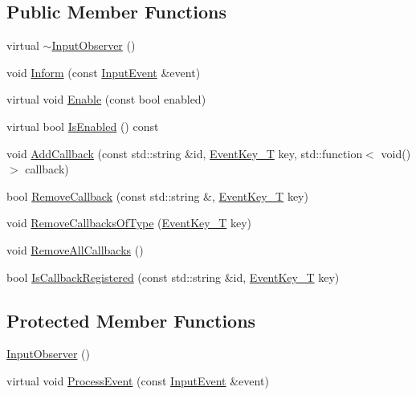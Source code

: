 \subsection*{Public Member Functions}
\begin{DoxyCompactItemize}
\item 
virtual \mbox{\hyperlink{classec_1_1_input_observer_ad6e40c0099cf4fe7aa9a54ef30e12046}{$\sim$\+Input\+Observer}} ()
\item 
void \mbox{\hyperlink{classec_1_1_input_observer_a9d12b9998638708cae180340de2c8550}{Inform}} (const \mbox{\hyperlink{structec_1_1_input_event}{Input\+Event}} \&event)
\item 
virtual void \mbox{\hyperlink{classec_1_1_input_observer_ad7e24dae551749986178b6758362d3e5}{Enable}} (const bool enabled)
\item 
virtual bool \mbox{\hyperlink{classec_1_1_input_observer_ae962bf8854a535e24b7a529819003d43}{Is\+Enabled}} () const
\item 
void \mbox{\hyperlink{classec_1_1_input_observer_a361289fd19508f86fa0213de9b64ba50}{Add\+Callback}} (const std\+::string \&id, \mbox{\hyperlink{namespaceec_a5de6bdb8c4b2ed6e590e721ec998f964}{Event\+Key\+\_\+T}} key, std\+::function$<$ void()$>$ callback)
\item 
bool \mbox{\hyperlink{classec_1_1_input_observer_ae731104af3af44b9f249132eb0d2ca6a}{Remove\+Callback}} (const std\+::string \&, \mbox{\hyperlink{namespaceec_a5de6bdb8c4b2ed6e590e721ec998f964}{Event\+Key\+\_\+T}} key)
\item 
void \mbox{\hyperlink{classec_1_1_input_observer_a6d1178046f73dad6045892169d0443fd}{Remove\+Callbacks\+Of\+Type}} (\mbox{\hyperlink{namespaceec_a5de6bdb8c4b2ed6e590e721ec998f964}{Event\+Key\+\_\+T}} key)
\item 
void \mbox{\hyperlink{classec_1_1_input_observer_a878c3bd0be4886780ef284abe68637af}{Remove\+All\+Callbacks}} ()
\item 
bool \mbox{\hyperlink{classec_1_1_input_observer_a72b0694089986db797bdf888fadbeed6}{Is\+Callback\+Registered}} (const std\+::string \&id, \mbox{\hyperlink{namespaceec_a5de6bdb8c4b2ed6e590e721ec998f964}{Event\+Key\+\_\+T}} key)
\end{DoxyCompactItemize}
\subsection*{Protected Member Functions}
\begin{DoxyCompactItemize}
\item 
\mbox{\hyperlink{classec_1_1_input_observer_ac8aa31f24d3ea4d627ab7fe899c93b03}{Input\+Observer}} ()
\item 
virtual void \mbox{\hyperlink{classec_1_1_input_observer_a287207f77fdc099f486daabff7fac4d5}{Process\+Event}} (const \mbox{\hyperlink{structec_1_1_input_event}{Input\+Event}} \&event)
\end{DoxyCompactItemize}
